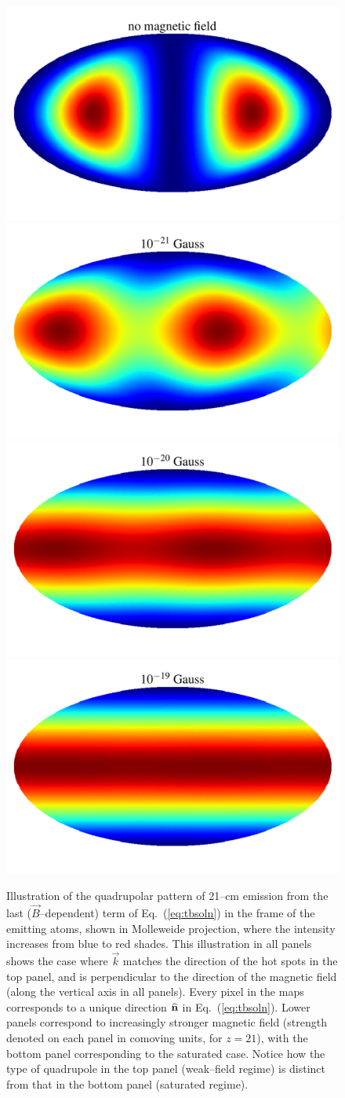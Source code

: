 \documentclass[aps,prd,twocolumn,floatfix,showpacs,superscriptaddress,nofootinbib]{revtex4-1}
\newcommand{\eq}[1]{{Eq.~(#1)}}
\begin{document}
\begin{figure}
\centering
\includegraphics[width=.4\textwidth,keepaspectratio=true]{hp_B_0e+00G.pdf}
\includegraphics[width=.4\textwidth,keepaspectratio=true]{hp_B_1e-18G.pdf}
\includegraphics[width=.4\textwidth,keepaspectratio=true]{hp_B_1e-17G.pdf}
\includegraphics[width=.4\textwidth,keepaspectratio=true]{hp_B_1e-16G.pdf}
\caption{Illustration of the quadrupolar pattern of 21--cm emission from the last ($\vec B$--dependent) term of \eq{\ref{eq:tbsoln}} in the frame of the emitting atoms, shown in Molleweide projection, where the intensity increases from blue to red shades. This illustration in all panels shows the case where $\vec k$ matches the direction of the hot spots in the top panel, and is perpendicular to the direction of the magnetic field (along the vertical axis in all panels). Every pixel in the maps corresponds to a unique direction $\bf{\widehat n}$ in Eq.~(\ref{eq:tbsoln}). Lower panels correspond to increasingly stronger magnetic field (strength denoted on each panel in comoving units, for $z=21$), with the bottom panel corresponding to the saturated case. Notice how the type of quadrupole in the top panel (weak--field regime) is distinct from that in the bottom panel (saturated regime). \label{fig:hp}}
\end{figure}
\end{document}
